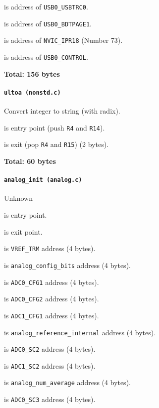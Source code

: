  is address of \texttt{USB0\_USBTRC0}.

 is address of \texttt{USB0\_BDTPAGE1}.

 is address of \texttt{NVIC\_IPR18} (Number 73).

 is address of \texttt{USB0\_CONTROL}.

\textbf{Total: 156 bytes}

\paragraph{\texttt{ultoa (nonstd.c)}} Convert integer to string (with radix).

 is entry point (push \texttt{R4} and \texttt{R14}).

 is exit (pop \texttt{R4} and \texttt{R15}) (2 bytes).

\textbf{Total: 60 bytes}

\paragraph{\texttt{analog\_init (analog.c)}} Unknown

 is entry point.

 is exit point.

 is \texttt{VREF\_TRM} address (4 bytes).

 is \texttt{analog\_config\_bits} address (4 bytes).

 is \texttt{ADC0\_CFG1} address (4 bytes).

 is \texttt{ADC0\_CFG2} address (4 bytes).

 is \texttt{ADC1\_CFG1} address (4 bytes).

 is \texttt{analog\_reference\_internal} address
(4 bytes).

 is \texttt{ADC0\_SC2} address (4 bytes).

 is \texttt{ADC1\_SC2} address (4 bytes).

 is \texttt{analog\_num\_average} address (4 bytes).

 is \texttt{ADC0\_SC3} address (4 bytes).

